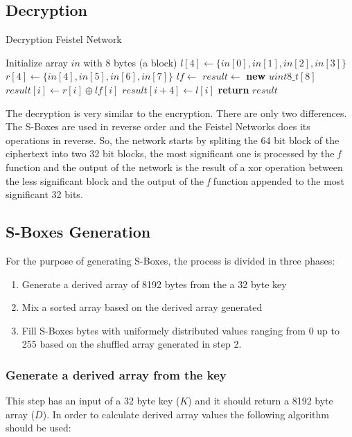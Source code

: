 \documentclass{article} %
\begin{document}
\subsection{Decryption}

\begin{algorithm}[H]
  \caption{Decryption Feistel Network}
  \begin{algorithmic}[1]
      \State Initialize array $in$ with 8 bytes (a block)
      \State $l[4] \gets \{in[0], in[1], in[2], in[3]\}$
      \State $r[4] \gets \{in[4], in[5], in[6], in[7]\}$
      \State $lf \gets$ 
      \State $result \gets$ \textbf{new} $uint8\_t[8]$
          \State $result[i] \gets r[i] \oplus lf[i]$
          \State $result[i + 4] \gets l[i]$
      \EndFor
      \State \textbf{return} $result$
  \end{algorithmic}
  \end{algorithm}

The decryption is very similar to the encryption. There are only two differences. The S-Boxes are used in reverse order and the Feistel Networks does
its operations in reverse. So, the network starts by spliting the 64 bit block of the ciphertext into two 32 bit blocks,
the most significant one is processed by the \textit{f} function and the output of the network is the result of a xor operation between 
the less significant block and the output of the \textit{f} function appended to the most significant 32 bits.

\subsection{S-Boxes Generation}
\label{sboxgen}
For the purpose of generating S-Boxes, the process is divided in three phases:
\begin{enumerate}
  \item Generate a derived array of 8192 bytes from the a 32 byte key
  \item Mix a sorted array based on the derived array generated
  \item Fill S-Boxes bytes with uniformely distributed values ranging from 0 up to 255 based on the shuffled array generated in step 2. 
\end{enumerate}

\subsubsection{Generate a derived array from the key}
This step has an input of a 32 byte key ($K$) and it should return a 8192 byte array ($D$).
In order to calculate derived array values the following algorithm should be used:
\end{document}
